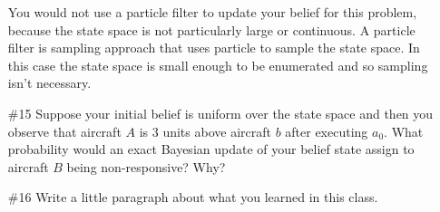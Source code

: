 \documentclass[12pt, oneside]{article}
\begin{document}
\begin{enumerate}
    You would not use a particle filter to update your belief for this problem,
    because the state space is not particularly large or continuous.
    A particle filter is sampling approach that uses particle to sample the
    state space.
    In this case the state space is small enough to be enumerated and so
    sampling isn't necessary.

  \item[\#15]
    Suppose your initial belief is uniform over the state space and then you
    observe that aircraft $A$ is $3$ units above aircraft $b$ after executing
    $a_0$.
    What probability would an exact Bayesian update of your belief state assign to
    aircraft $B$ being non-responsive?
    Why?

  \item[\#16]
    Write a little paragraph about what you learned in this class.
\end{enumerate}
\end{document}
